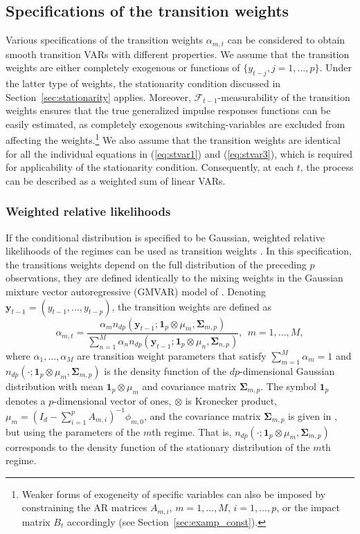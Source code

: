 \documentclass[nojss]{jss}
\begin{document}
\subsection{Specifications of the transition weights}
Various specifications of the transition weights $\alpha_{m,t}$ can be considered to obtain smooth transition VARs with different properties. We assume that the transition weights are either completely exogenous or functions of $\lbrace y_{t-j}, j=1,...,p \rbrace$. Under the latter type of weights, the stationarity condition discussed in Section~\ref{sec:stationarity} applies. Moreover, $\mathcal{F}_{t-1}$-measurability of the transition weights ensures that the true generalized impulse responses functions can be easily estimated, as completely exogenous switching-variables are excluded from affecting the weights.\footnote{Weaker forms of exogeneity of specific variables can also be imposed by constraining the AR matrices $A_{m,i}$, $m=1,...,M$, $i=1,...,p$, or the impact matrix $B_t$ accordingly (see Section~\ref{sec:examp_const}).} We also assume that the transition weights are identical for all the individual equations in (\ref{eq:stvar1}) and (\ref{eq:stvar3}), which is required for applicability of the stationarity condition. Consequently, at each $t$‚ the process can be described as a weighted sum of linear VARs.

\subsubsection{Weighted relative likelihoods}\label{sec:rel_dens}
If the conditional distribution is specified to be Gaussian, weighted relative likelihoods of the regimes can be used as transition weights \citep{Lanne+Virolainen:2024}. In this specification, the transitions weights depend on the full distribution of the preceding $p$ observations, they are defined identically to the mixing weights in the Gaussian mixture vector autoregressive (GMVAR) model of \cite{Kalliovirta+Meitz+Saikkonen:2016}.
Denoting $\boldsymbol{y}_{t-1}=(y_{t-1},...,y_{t-p})$, the transition weights are defined as
\begin{equation}\label{eq:alpha_mt}
\alpha_{m,t} = \frac{\alpha_m n_{dp}(\boldsymbol{y}_{t-1};\boldsymbol{1}_p\otimes \mu_m, \boldsymbol{\Sigma}_{m,p})}{\sum_{n=1}^M \alpha_n n_{dp}(\boldsymbol{y}_{t-1};\boldsymbol{1}_p\otimes \mu_n, \boldsymbol{\Sigma}_{n,p})}, \ \ m=1,...,M,
\end{equation}
where $\alpha_1,...,\alpha_M$ are transition weight parameters that satisfy $\sum_{m=1}^M \alpha_m=1$ and $n_{dp}(\cdot;\boldsymbol{1}_p\otimes \mu_m, \boldsymbol{\Sigma}_{m,p})$ is the density function of the $dp$-dimensional Gaussian distribution with mean $\boldsymbol{1}_p\otimes \mu_m$ and covariance matrix $\boldsymbol{\Sigma}_{m,p}$. The symbol $\boldsymbol{1}_p$ denotes a $p$-dimensional vector of ones, $\otimes$ is Kronecker product, $\mu_m=(I_d - \sum_{i=1}^pA_{m,i})^{-1}\phi_{m,0}$, and the covariance matrix $\boldsymbol{\Sigma}_{m,p}$ is given in \citet[Equation~(2.1.39)]{Lutkepohl:2005}, but using the parameters of the $m$th regime. That is, $n_{dp}(\cdot;\boldsymbol{1}_p\otimes \mu_m, \boldsymbol{\Sigma}_{m,p})$ corresponds to the density function of the stationary distribution of the $m$th regime.
\end{document}
